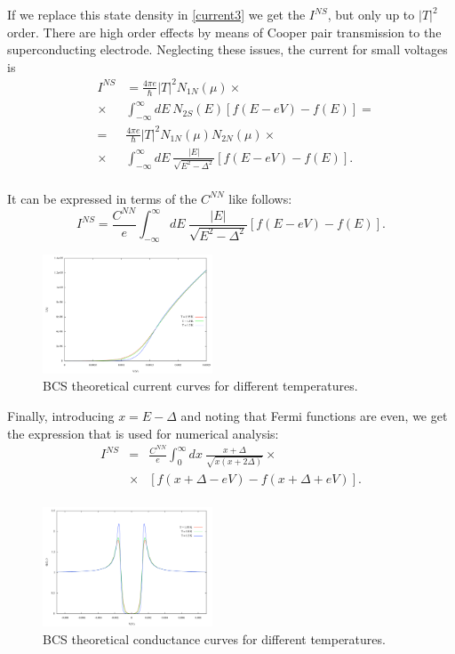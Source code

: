 If we replace this state density in \eqref{current3} we get the $I^{NS}$, but only up to $|T|^2$ order. There are high order effects by means of Cooper pair transmission to the superconducting electrode. Neglecting these issues, the current for small voltages is
\begin{eqnarray}\label{ins_previous}
&I^{NS}& = \frac{4\pi e}{\hbar} |T|^2 N_{1N}(\mu) \times
		\nonumber \\
		&\times& \int_{-\infty}^{\infty} dE\ N_{2S}(E) [f(E-eV)-f(E)] =
		\nonumber \\
		&=& \frac{4\pi e}{\hbar} |T|^2 N_{1N}(\mu) N_{2N}(\mu) \times
		\nonumber \\
		&\times& \int_{-\infty}^{\infty} dE\ \frac{|E|}{\sqrt{E^2-\Delta^2}} [f(E-eV)-f(E)].
		\nonumber \\
\end{eqnarray}

It can be expressed in terms of the $C^{NN}$ like follows:
\begin{equation}\label{ins}
I^{NS} = \frac{C^{NN}}{e} \int_{-\infty}^{\infty} dE\ \frac{|E|}{\sqrt{E^2-\Delta^2}} [f(E-eV)-f(E)].
\end{equation}


\begin{figure}[t!]
\centering
\includegraphics[width=0.45\textwidth]{iv_theoretical_4-5-10}
\caption{\small BCS theoretical current curves for different temperatures. 
\label{iv_theoretical_4-5-10}}
\end{figure}


Finally, introducing $x=E-\Delta$ and noting that Fermi functions are even, we get the expression that is used for numerical analysis:
\begin{eqnarray}\label{ins_numerical}
I^{NS} &=& \frac{C^{NN}}{e} \int_{0}^{\infty} dx\ \frac{x+\Delta}{\sqrt{x(x+2 \Delta)}} \times
		\nonumber \\
		&\times& [f(x+ \Delta-eV)-f(x+ \Delta +eV)].
		\nonumber \\
\end{eqnarray}

\begin{figure}[h!]
\centering
\includegraphics[width=0.45\textwidth]{gv_theoretical_4-5-10}
\caption{\small BCS theoretical conductance curves for different temperatures.
\label{gv_theoretical_4-5-10}}
\end{figure}

